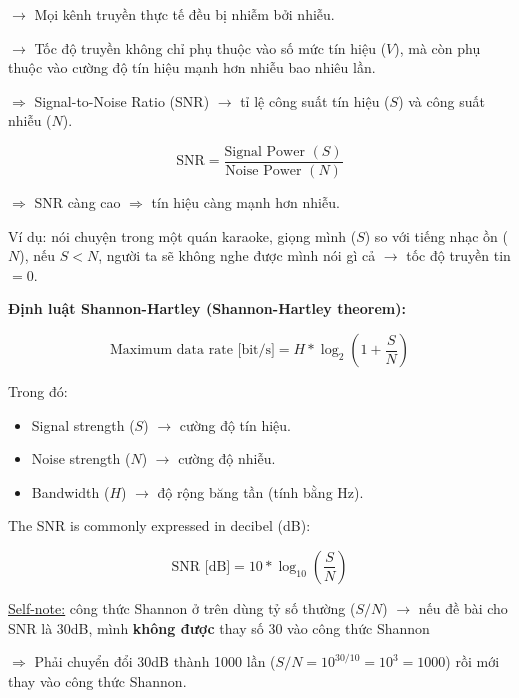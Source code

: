 \noindent
$\rightarrow$ Mọi kênh truyền thực tế đều bị nhiễm bởi nhiễu.
\medskip

\noindent
$\rightarrow$ Tốc độ truyền không chỉ phụ thuộc vào số mức tín hiệu ($V$), mà còn phụ thuộc vào cường độ tín hiệu mạnh hơn nhiễu bao nhiêu lần.

$\Rightarrow$ Signal-to-Noise Ratio (SNR) $\rightarrow$ tỉ lệ công suất tín hiệu ($S$) và công suất nhiễu ($N$).
\medskip

\begin{equation*}
    \text{SNR} = \frac{\text{Signal Power }(S)}{\text{Noise Power }(N)}
\end{equation*}
\medskip

\noindent
$\Rightarrow$ SNR càng cao $\Rightarrow$ tín hiệu càng mạnh hơn nhiễu.
\medskip

\noindent
Ví dụ: nói chuyện trong một quán karaoke, giọng mình ($S$) so với tiếng nhạc ồn ($N$), nếu $S < N$, người ta sẽ không nghe được mình nói gì cả $\rightarrow$ tốc độ truyền tin $= 0$.
\medskip

\noindent
\textbf{Định luật Shannon-Hartley (Shannon-Hartley theorem):}

\begin{equation*}
    \text{Maximum data rate [bit/s]} = H * \log_2(1 + \frac{S}{N})
\end{equation*}
\medskip

\noindent
Trong đó:

\begin{itemize}
    \item Signal strength ($S$) $\rightarrow$ cường độ tín hiệu.
    \item Noise strength ($N$) $\rightarrow$ cường độ nhiễu.
    \item Bandwidth ($H$) $\rightarrow$ độ rộng băng tần (tính bằng Hz).
\end{itemize}
\medskip

\noindent
The SNR is commonly expressed in decibel (dB):

\begin{equation*}
    \text{SNR [dB]} = 10 * \log_{10}(\frac{S}{N})
\end{equation*}
\medskip

\noindent
\underline{Self-note:} công thức Shannon ở trên dùng tỷ số thường ($S/N$) $\rightarrow$ nếu đề bài cho SNR là 30dB, mình \textbf{không được} thay số 30 vào công thức Shannon 

$\Rightarrow$ Phải chuyển đổi 30dB thành 1000 lần ($S/N = 10^{30/10} = 10^3 = 1000$) rồi mới thay vào công thức Shannon.
\medskip

